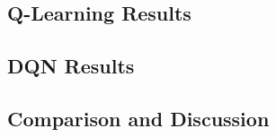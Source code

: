\documentclass[final,11pt,times]{elsarticle}
\begin{document}


\subsection{Q-Learning Results}



\subsection{DQN Results}



\subsection{Comparison and Discussion}


\end{document}
